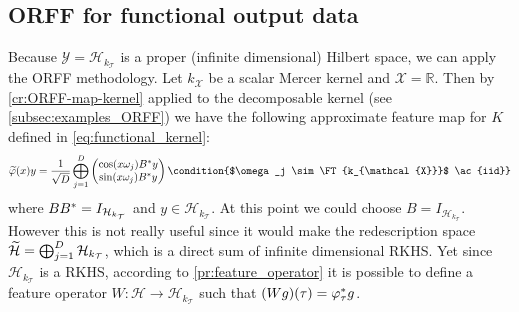 \subsection{ORFF for functional output data}
Because $\mathcal{Y}=\mathcal{H}_{k_{\mathcal{T}}}$ is a proper (infinite
dimensional) Hilbert space, we can apply the \acs{ORFF} methodology. Let
$k_{\mathcal{X}}$ be a scalar Mercer kernel and $\mathcal{X}=\mathbb{R}$. Then
by \cref{cr:ORFF-map-kernel} applied to the decomposable kernel (see
\cref{subsec:examples_ORFF}) we have the following approximate feature map for
$K$ defined in \cref{eq:functional_kernel}:
\begin{dmath*}
    \tildePhi{\omega}(x)y = \frac{1}{\sqrt{D}}\Vect_{j=1}^D
    \begin{pmatrix}
        \cos(x \omega_j) B^\adjoint y \\
        \sin(x \omega_j) B^\adjoint y
    \end{pmatrix} \condition{$\omega_j \sim \FT{k_{\mathcal{X}}}$
    \ac{iid}}
\end{dmath*}
where $BB^* = I_{\mathcal{H}_{k_{\mathcal{T}}}}$ and
$y\in\mathcal{H}_{k_{\mathcal{T}}}$. At this point we could choose
$B=I_{\mathcal{H}_{k_{\mathcal{T}}}}$. However this is not really useful since
it would make the redescription space $\widetilde{\mathcal{H}}=\operatorname*{\bigoplus}_{j=1}^D
\mathcal{H}_{k_{\mathcal{T}}}$, which is a direct sum of infinite dimensional
\acs{RKHS}. Yet since $\mathcal{H}_{k_{\mathcal{T}}}$ is a \acs{RKHS},
according to \cref{pr:feature_operator} it is possible to define a feature
operator $W:\mathcal{H}\to\mathcal{H}_{k_{\mathcal{T}}}$ such that
$(Wg)(\tau)=\Phi_\tau^\adjoint g$. 
